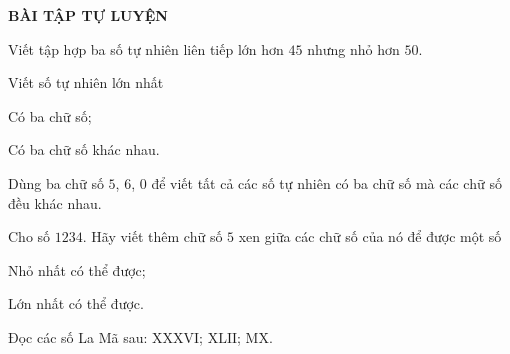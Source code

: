 \begin{center}
\textbf{BÀI TẬP TỰ LUYỆN}
\end{center}
\begin{bt}%
Viết tập hợp ba số tự nhiên liên tiếp lớn hơn $45$ nhưng nhỏ hơn $50$.
\end{bt}

\begin{bt}%
Viết số tự nhiên lớn nhất
\begin{enumEX}{2}
	\item Có ba chữ số;
	\item Có ba chữ số khác nhau.
\end{enumEX}
\end{bt}

\begin{bt}%
	Dùng ba chữ số $5$, $6$, $0$ để viết tất cả các số tự nhiên có ba chữ số mà các chữ số đều khác nhau.
\end{bt}


\begin{bt}%
	Cho số $1234$. Hãy viết thêm chữ số $5$ xen giữa các chữ số của nó để được một số
	\begin{enumEX}{2}
		\item Nhỏ nhất có thể được;
		\item Lớn nhất có thể được.
	\end{enumEX}
\end{bt}

\begin{bt}%
	Đọc các số La Mã sau: $\mathrm{XXXVI}$; $\mathrm{XLII}$; $\mathrm{MX}$.
\end{bt}
